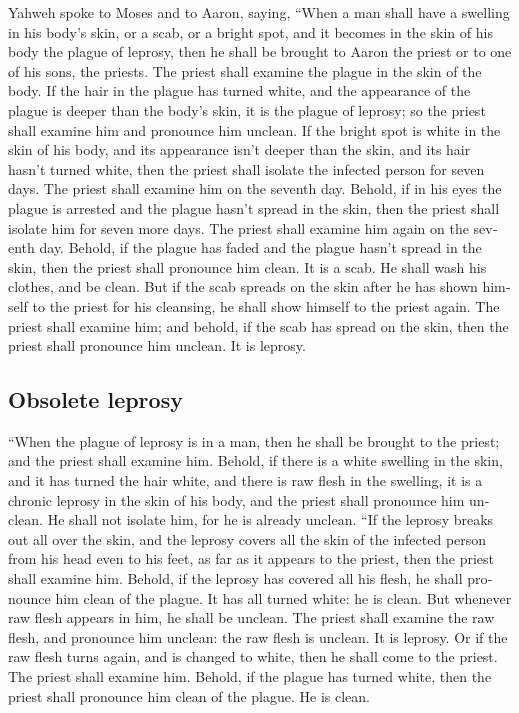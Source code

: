 \begin{paracol}{2}
\begin{otherlanguage}{english}
 Yahweh spoke to Moses and to Aaron, saying,
 ``When a man shall have a swelling in his body's skin, or
a scab, or a bright spot, and it becomes in the skin of his body the
plague of leprosy, then he shall be brought to Aaron the priest or to
one of his sons, the priests.  The priest shall examine
the plague in the skin of the body. If the hair in the plague has turned
white, and the appearance of the plague is deeper than the body's skin,
it is the plague of leprosy; so the priest shall examine him and
pronounce him unclean.  If the bright spot is white in the
skin of his body, and its appearance isn't deeper than the skin, and its
hair hasn't turned white, then the priest shall isolate the infected
person for seven days.  The priest shall examine him on
the seventh day. Behold, if in his eyes the plague is arrested and the
plague hasn't spread in the skin, then the priest shall isolate him for
seven more days.  The priest shall examine him again on
the seventh day. Behold, if the plague has faded and the plague hasn't
spread in the skin, then the priest shall pronounce him clean. It is a
scab. He shall wash his clothes, and be clean.  But if the
scab spreads on the skin after he has shown himself to the priest for
his cleansing, he shall show himself to the priest again. 
The priest shall examine him; and behold, if the scab has spread on the
skin, then the priest shall pronounce him unclean. It is leprosy.

\hypertarget{obsolete-leprosy}{%
\subsection{Obsolete leprosy}\label{obsolete-leprosy}}

 ``When the plague of leprosy is in a man, then he shall
be brought to the priest;  and the priest shall examine
him. Behold, if there is a white swelling in the skin, and it has turned
the hair white, and there is raw flesh in the swelling, 
it is a chronic leprosy in the skin of his body, and the priest shall
pronounce him unclean. He shall not isolate him, for he is already
unclean.  ``If the leprosy breaks out all over the skin,
and the leprosy covers all the skin of the infected person from his head
even to his feet, as far as it appears to the priest, 
then the priest shall examine him. Behold, if the leprosy has covered
all his flesh, he shall pronounce him clean of the plague. It has all
turned white: he is clean.  But whenever raw flesh
appears in him, he shall be unclean.  The priest shall
examine the raw flesh, and pronounce him unclean: the raw flesh is
unclean. It is leprosy.  Or if the raw flesh turns again,
and is changed to white, then he shall come to the priest.
 The priest shall examine him. Behold, if the plague has
turned white, then the priest shall pronounce him clean of the plague.
He is clean.


\end{otherlanguage}
\end{paracol}
